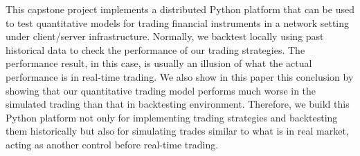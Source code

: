 
%
This capstone project implements a distributed Python platform that can be used to test quantitative models for trading financial instruments in a network setting under client/server infrastructure. Normally, we backtest locally using past historical data to check the performance of our trading strategies. The performance result, in this case, is usually an illusion of what the actual performance is in real-time trading. We also show in this paper this conclusion by showing that our quantitative trading model performs much worse in the simulated trading than that in backtesting environment. Therefore, we build this Python platform not only for implementing trading strategies and backtesting them historically but also for simulating trades similar to what is in real market, acting as another control before real-time trading.